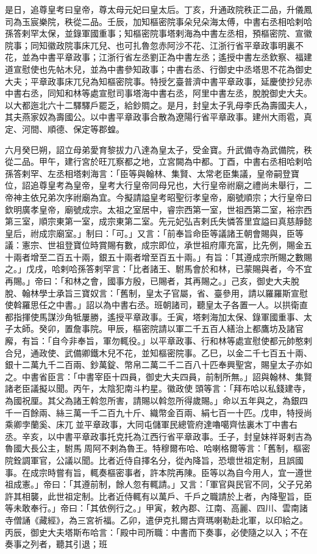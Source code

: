 \begin{pinyinscope}
 是日，追尊皇考曰皇帝，尊太母元妃曰皇太后。丁亥，升通政院秩正二品，升儀鳳司為玉宸樂院，秩從二品。壬辰，加知樞密院事朵兒朵海太傅，中書右丞相哈剌哈孫答剌罕太保，並錄軍國重事；知樞密院事塔剌海為中書左丞相，預樞密院、宣徽院事；同知徽政院事床兀兒、也可扎魯忽赤阿沙不花、江浙行省平章政事明裏不花，並為中書平章政事；江浙行省左丞劉正為中書左丞；遙授中書左丞欽察、福建道宣慰使也先帖木兒，並為中書參知政事；中書右丞、行御史中丞塔思不花為御史大夫；平章政事床兀兒為知樞密院事。特授乞臺普濟中書平章政事，延慶使抄兒赤中書右丞，同知和林等處宣慰司事塔海中書右丞，阿里中書左丞，脫脫御史大夫。以大都迤北六十二驛驛戶罷乏，給鈔賙之。是月，封皇太子乳母李氏為壽國夫人，其夫燕家奴為壽國公。以中書平章政事合散為遼陽行省平章政事。建州大雨雹，真定、河間、順德、保定等郡蝗。



 六月癸巳朔，詔立母弟愛育黎拔力八達為皇太子，受金寶。升武備寺為武備院，秩從二品。甲午，建行宮於旺兀察都之地，立宮闕為中都。丁酉，中書右丞相哈剌哈孫答剌罕、左丞相塔剌海言：「臣等與翰林、集賢、太常老臣集議，皇帝嗣登寶位，詔追尊皇考為皇帝，皇考大行皇帝同母兄也，大行皇帝祔廟之禮尚未舉行，二帝神主依兄弟次序祔廟為宜。今擬請謚皇考昭聖衍孝皇帝，廟號順宗；大行皇帝曰欽明廣孝皇帝，廟號成宗。太祖之室居中，睿宗西第一室，世祖西第二室，裕宗西第三室，順宗東第一室，成宗東第二室。先元妃弘吉剌氏失憐答里宜謚曰真慈靜懿皇后，祔成宗廟室。」制曰：「可。」又言：「前奉旨命臣等議諸王朝會賜與，臣等議：憲宗、世祖登寶位時賞賜有數，成宗即位，承世祖府庫充富，比先例，賜金五十兩者增至二百五十兩，銀五十兩者增至百五十兩。」有旨：「其遵成宗所賜之數賜之。」戊戌，哈剌哈孫答剌罕言：「比者諸王、駙馬會於和林，已蒙賜與者，今不宜再賜。」帝曰：「和林之會，國事方殷，已賜者，其再賜之。」己亥，御史大夫脫脫、翰林學士承旨三寶奴言：「舊制，皇太子官屬，省、臺參用，請以羅羅斯宣慰使斡羅思任之中書。」詔以為中書右丞。班朝諸司，聽皇太子各置一人。以拱衛直都指揮使馬謀沙角牴屢勝，遙授平章政事。壬寅，塔剌海加太保、錄軍國重事、太子太師。癸卯，置詹事院。甲辰，樞密院請以軍二千五百人繕治上都鷹坊及諸官廨，有旨：「自今非奉旨，軍勿輒役。」以平章政事、行和林等處宣慰使都元帥憨剌合兒，通政使、武備卿鐵木兒不花，並知樞密院事。乙巳，以金二千七百五十兩、銀十二萬九千二百兩、鈔萬錠、幣帛二萬二千二百八十匹奉興聖宮，賜皇太子亦如之。中書省臣言：「中書宰臣十四員，御史大夫四員，前制所無。」詔與翰林、集賢諸老臣議擬以聞。丙午，太陰犯南斗杓星。徽政使頭等言：「拜布哈以私錢建寺，為國祝厘。其父為諸王斡忽所害，請賜以斡忽所得歲賜。」命以五年與之，為銀四千一百餘兩、絲三萬一千二百九十斤、織幣金百兩、絹七百一十匹。戊申，特授尚乘卿孛蘭奚、床兀並平章政事，大同屯儲軍民總管府達嚕噶齊怯裏木丁中書右丞。辛亥，以中書平章政事托克托為江西行省平章政事。壬子，封皇妹祥哥剌吉為魯國大長公主，駙馬周阿不剌為魯王。特穆爾布哈、哈喇格爾等言：「舊制，樞密院銓調軍官，公議以聞。比者近侍自擇名分，從內降旨，恐壞世祖定制，且誤國事。在成宗時嘗有旨，輒奏樞密事者，許本院再陳。臣等以為自今用人，宜一遵世祖成憲。」帝曰：「其遵前制，餘人忽有輒請。」又言：「軍官與民官不同，父子兄弟許其相襲，此世祖定制。比者近侍輒有以萬戶、千戶之職請於上者，內降聖旨，臣等未敢奉行。」帝曰：「其依例行之。」甲寅，敕內郡、江南、高麗、四川、雲南諸寺僧誦《藏經》，為三宮祈福。乙卯，遣伊克扎爾古齊瑪喇勒赴北軍，以印給之。丙辰，御史大夫塔斯布哈言：「殿中司所職：中書而下奏事，必使隨之以入；不在奏事之列者，聽其引退；班
\end{pinyinscope}
